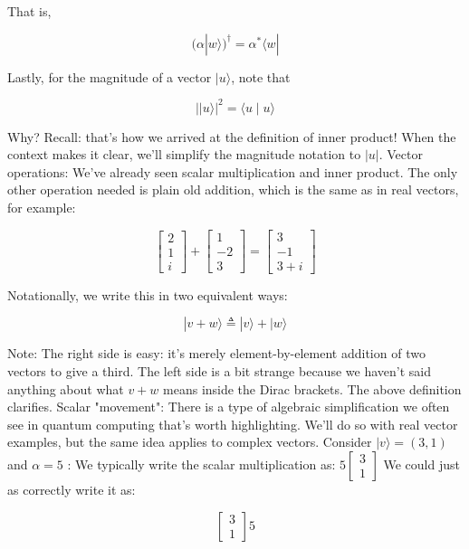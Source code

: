 \documentclass[main.tex]{subfiles}
\begin{document}
    That is,
    
    $$
    (\alpha|w\rangle)^{\dagger}=\alpha^{*}\langle w|
    $$
    
    Lastly, for the magnitude of a vector $|u\rangle$, note that
    
    $$
    || u\rangle\left.\right|^{2}=\langle u \mid u\rangle
    $$
    
    Why? Recall: that's how we arrived at the definition of inner product! When the context makes it clear, we'll simplify the magnitude notation to $|u|$. Vector operations: We've already seen scalar multiplication and inner product. The only other operation needed is plain old addition, which is the same as in real vectors, for example:
    
    $$
    \left[\begin{array}{l}
    2 \\
    1 \\
    i
    \end{array}\right]+\left[\begin{array}{r}
    1 \\
    -2 \\
    3
    \end{array}\right]=\left[\begin{array}{r}
    3 \\
    -1 \\
    3+i
    \end{array}\right]
    $$
    
    Notationally, we write this in two equivalent ways:
    
    $$
    |v+w\rangle \triangleq|v\rangle+|w\rangle
    $$
    
    Note: The right side is easy: it's merely element-by-element addition of two vectors to give a third. The left side is a bit strange because we haven't said anything about what $v+w$ means inside the Dirac brackets. The above definition clarifies. Scalar "movement": There is a type of algebraic simplification we often see in quantum computing that's worth highlighting. We'll do so with real vector examples, but the same idea applies to complex vectors. Consider $|v\rangle=(3,1)$ and $\alpha=5$ : We typically write the scalar multiplication as: $5\left[\begin{array}{l}3 \\ 1\end{array}\right]$ We could just as correctly write it as:
    
    $$
    \left[\begin{array}{l}
    3 \\
    1
    \end{array}\right] 5
    $$
    
\end{document}
